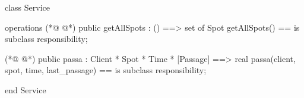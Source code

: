 \begin{vdmpp}[breaklines=true]
class Service 

operations
(*@
\label{getAllSpots:4}
@*)
 public getAllSpots : () ==> set of Spot
 getAllSpots() == 
    is subclass responsibility;
  
(*@
\label{passa:8}
@*)
 public passa : Client * Spot * Time * [Passage] ==> real
 passa(client, spot, time, last_passage) == 
  is subclass responsibility;
  
end Service
\end{vdmpp}
